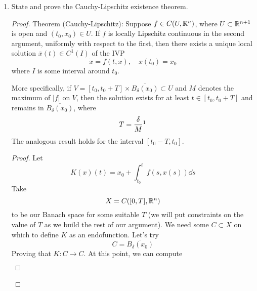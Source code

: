 \documentclass[../psets.tex]{subfiles}
\begin{document}
\begin{enumerate}
\begin{proof}
        We can apply it to the scalar function $\Phi(x)=x/2$ and the vector function $\Phi(x,y)=(x/2,y/2)$. In both cases, the origin of $\R^n$ ($n=1,2$) is the fixed point.
    \end{proof}
    \item State and prove the Cauchy-Lipschitz existence theorem.
    \begin{proof}
        Theorem (Cauchy-Lipschitz): Suppose $f\in C(U,\mathbb{R}^n)$, where $U\subset\mathbb{R}^{n+1}$ is open and $(t_0,x_0)\in U$. If $f$ is locally Lipschitz continuous in the second argument, uniformly with respect to the first, then there exists a unique local solution $\bar{x}(t)\in C^1(I)$ of the IVP
        \begin{equation*}
            \dot{x} = f(t,x)
            ,\quad
            x(t_0) = x_0
        \end{equation*}
        where $I$ is some interval around $t_0$.\par
        More specifically, if $V=[t_0,t_0+T]\times\overline{B_\delta(x_0)}\subset U$ and $M$ denotes the maximum of $|f|$ on $V$, then the solution exists for at least $t\in[t_0,t_0+T]$ and remains in $\overline{B_\delta(x_0)}$, where
        \begin{equation*}
            T = \frac{\delta}{M}\footnotemark
        \end{equation*}
        The analogous result holds for the interval $[t_0-T,t_0]$.
        \begin{proof}
            Let
            \begin{equation*}
                K(x)(t) = x_0+\int_{t_0}^tf(s,x(s))\dd{s}
            \end{equation*}
            Take
            \begin{equation*}
                X = C([0,T],\mathbb{R}^n)
            \end{equation*}
            to be our Banach space for some suitable $T$ (we will put constraints on the value of $T$ as we build the rest of our argument).
            We need some $C\subset X$ on which to define $K$ as an endofunction. Let's try
            \begin{equation*}
                C = \overline{B_\delta(x_0)}
            \end{equation*}
            Proving that $K:C\to C$. At this point, we can compute
            \begin{align*}

\end{align*}
\end{proof}
\end{proof}
\end{enumerate}
\end{document}
